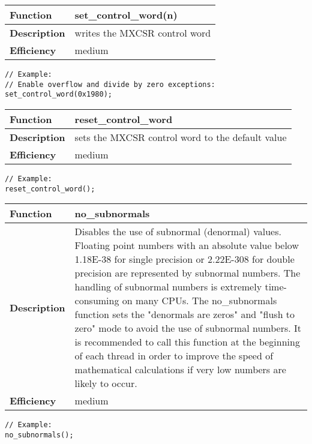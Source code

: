 \documentclass[vcl_manual.tex]{subfiles}
\begin{document}
\begin{tabular}{|p{25mm}|p{100mm}|}
\hline
\bfseries Function & set\_control\_word(n) \\ \hline
\bfseries Description & writes the MXCSR control word \\ \hline
\bfseries Efficiency & medium \\ \hline
\end{tabular}
\begin{lstlisting}[frame=none]
// Example:  
// Enable overflow and divide by zero exceptions:
set_control_word(0x1980); 
\end{lstlisting}


\begin{tabular}{|p{25mm}|p{100mm}|}
\hline
\bfseries Function & reset\_control\_word \\ \hline
\bfseries Description & sets the MXCSR control word to the default value \\ \hline
\bfseries Efficiency & medium \\ \hline
\end{tabular}
\begin{lstlisting}[frame=none]
// Example:
reset_control_word();
\end{lstlisting}

\label{noSubnormals}
\begin{tabular}{|p{25mm}|p{100mm}|}
\hline
\bfseries Function & no\_subnormals \\ \hline
\bfseries Description & Disables the use of subnormal (denormal) values. \newline
Floating point numbers with an absolute value below  \newline
1.18E-38 for single precision or 2.22E-308 for double precision are represented by subnormal numbers. The handling of subnormal numbers is extremely time-consuming on many CPUs. The no\_subnormals function sets the "denormals are zeros" and "flush to zero" mode to avoid the use of subnormal numbers. It is recommended to call this function at the beginning of each thread in order to improve the speed of mathematical calculations if very low numbers are likely to occur. \\ \hline
\bfseries Efficiency & medium \\ \hline
\end{tabular}
\begin{lstlisting}[frame=none]
// Example:
no_subnormals();
\end{lstlisting}
\end{document}
